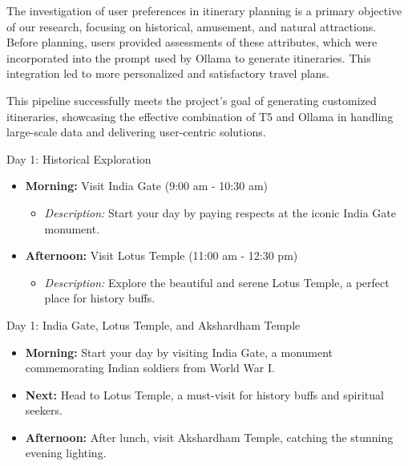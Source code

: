 \documentclass[conference]{IEEEtran}
\begin{document}
        The investigation of user preferences in itinerary planning is a primary objective of our research, focusing on historical, amusement, and natural attractions. Before planning, users provided assessments of these attributes, which were incorporated into the prompt used by Ollama to generate itineraries. This integration led to more personalized and satisfactory travel plans.

        This pipeline successfully meets the project's goal of generating customized itineraries, showcasing the effective combination of T5 and Ollama in handling large-scale data and delivering user-centric solutions.

\begin{tcolorbox}[colframe=black!75!white, colback=white!90!black, title=Sample One-Day Itinerary with User Preferences]
Day 1: Historical Exploration
\begin{itemize}
    \item \textbf{Morning:} Visit India Gate (9:00 am - 10:30 am)
    \begin{itemize}
        \item \textit{Description:} Start your day by paying respects at the iconic India Gate monument.
    \end{itemize}
    \item \textbf{Afternoon:} Visit Lotus Temple (11:00 am - 12:30 pm)
    \begin{itemize}
        \item \textit{Description:} Explore the beautiful and serene Lotus Temple, a perfect place for history buffs.
    \end{itemize}
\end{itemize}
\end{tcolorbox}

\begin{tcolorbox}[colframe=black!75!white, colback=white!90!black, title=Sample One-Day Itinerary without User Preferences]
Day 1: India Gate, Lotus Temple, and Akshardham Temple
\begin{itemize}
    \item \textbf{Morning:} Start your day by visiting India Gate, a monument commemorating Indian soldiers from World War I.
    \item \textbf{Next:} Head to Lotus Temple, a must-visit for history buffs and spiritual seekers.
    \item \textbf{Afternoon:} After lunch, visit Akshardham Temple, catching the stunning evening lighting.
\end{itemize}
\end{tcolorbox}
\end{document}
